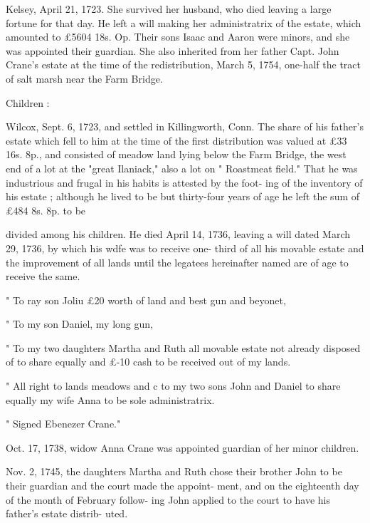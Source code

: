 \documentclass{book}
\begin{document}
Kelsey, April 21, 1723. She survived her husband, who died 
leaving a large fortune for that day. He left a will making her 
administratrix of the estate, which amounted to £5604  18s.  Op. 
Their sons Isaac and Aaron were minors, and she was appointed 
their guardian. She also inherited from her father Capt. John 
Crane's estate at the time of the redistribution, March 5, 1754, 
one-half the tract of salt marsh near the Farm Bridge. 

Children : 







Wilcox, Sept. 6, 1723, and settled in Killingworth, Conn. The 
share of his father's estate which fell to him at the time of the 
first distribution was valued at £33  16s.  8p., and consisted of 
meadow land lying below the Farm Bridge, the west end of a lot 
at the "great Ilaniack," also a lot on " Roastmeat field." That 
he was industrious and frugal in his habits is attested by the foot- 
ing of the inventory of his estate ; although he lived to be but 
thirty-four years of age he left the sum of £484  8s.  8p. to be 




divided among his children. He died April 14, 1736, leaving a 
will dated March 29, 1736, by which his wdfe was to receive one- 
third of all his movable estate and the improvement of all lands 
until the legatees hereinafter named are of age to receive the same. 

" To ray son Joliu £20 worth of land and best gun and beyonet, 

" To my son Daniel, my long gun, 

" To my two daughters Martha and Ruth all movable estate not already 
disposed of to share equally and £-10 cash to be received out of my lands. 

" All right to lands meadows and c to my two sons John and Daniel 
to share equally my wife Anna to be sole administratrix. 

" Signed Ebenezer Crane." 

Oct. 17, 1738, widow Anna Crane was appointed guardian of 
her minor children. 

Nov. 2, 1745, the daughters Martha and Ruth chose their 
brother John to be their guardian and the court made the appoint- 
ment, and on the eighteenth day of the month of February follow- 
ing John applied to the court to have his father's estate distrib- 
uted. 
\end{document}
